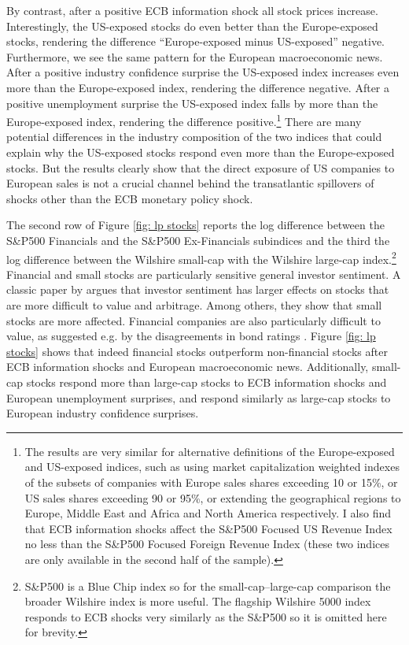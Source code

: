 \documentclass[a4paper,12pt]{article}
\begin{document}
By contrast, after a positive ECB information shock all stock prices increase. Interestingly, the US-exposed stocks do even better than the Europe-exposed stocks, rendering the difference ``Europe-exposed minus US-exposed'' negative.
Furthermore, we see the same pattern for the European macroeconomic news.
After a positive industry confidence surprise the US-exposed index increases even more than the Europe-exposed index, rendering the difference negative.
After a positive unemployment surprise the US-exposed index falls by more than the Europe-exposed
index, rendering the difference positive.\footnote{The results
are very similar for alternative definitions of the Europe-exposed and US-exposed indices, such as
using market capitalization weighted indexes of the subsets of companies with Europe sales shares exceeding 10 or 15\%, or US sales shares exceeding 90 or 95\%, or extending the geographical regions to Europe, Middle East and Africa and North America respectively. I also find that ECB information shocks affect the S\&P500 Focused US Revenue Index no less than
the S\&P500 Focused Foreign Revenue Index (these two indices are only available in the second half of the sample).} 
There are many potential differences in the industry composition of the two indices that could explain why the US-exposed stocks respond even more than the Europe-exposed stocks. But the results clearly show that the direct exposure of US companies to European sales is not a crucial channel behind the transatlantic spillovers of shocks other than the ECB monetary policy shock.

The second row of Figure \ref{fig: lp stocks} reports the log difference between
the S\&P500 Financials and the S\&P500 Ex-Financials subindices and the third the log difference
between the Wilshire small-cap with the Wilshire large-cap index.\footnote{S\&P500 is a Blue Chip index so for the small-cap--large-cap comparison the broader Wilshire index is more useful. The flagship Wilshire 5000 index responds to ECB shocks very similarly as the S\&P500 so it is omitted here for brevity.} 
Financial and small stocks are particularly sensitive general investor sentiment.
A classic paper by \cite{Baker_Wurgler_2006} argues that investor sentiment has larger effects on stocks that are more difficult to value and arbitrage. Among others, they show that small stocks are more affected. Financial companies are also particularly difficult to value, as suggested e.g. by the
disagreements in bond ratings \citep{Morgan_2002}.
Figure \ref{fig: lp stocks} shows that indeed financial stocks outperform non-financial
stocks after ECB information shocks and European macroeconomic news.
Additionally, small-cap stocks respond more than large-cap stocks to ECB information shocks and European unemployment surprises, and respond similarly as large-cap stocks to European industry confidence surprises.
\end{document}
